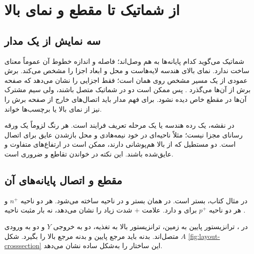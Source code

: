 \section{از شماتیک تا مقطع و نمای بالا}
\label{sec:layout-views}
\subsection{سه نمایش از یک مدار}
شماتیک می‌گوید کدام پایانه‌ها به هم وصل‌اند؛ فاصله و اندازه خطوط آن عموماً معنای
ساخت ندارد.  نمای بالای هندسه لایه‌هاست و محل و ابعاد اجزا را مشخص می‌کند.
 برش عمودی از یک مسیر مشخص روی همان  است؛
فقط اجزایی را نشان می‌دهد که صفحه برش از آن‌ها می‌گذرد
\cite[بخش  و شکل‌های  و ]{weste}.
پس ممکن است دو  در شماتیک متصل باشند، ولی سیم مشترک آن‌ها در مقطع خاص دیده نشود.
برای فهم مدار باید اتصال‌های خارج از صفحه برش را نیز از نمای بالا یا برچسب‌ها خواند.

 در نقشه، یک رده هندسه یا یک مرحله تعریف فرایند است.
هر رنگ لزوماً یک ورقه رسانای مجزا نیست؛ مثلاً  ناحیه‌ای در خود
نیمه‌هادی و  محل بازشدن عایق برای اتصال است.
دو مستطیل که از بالا هم‌پوشانی دارند، ممکن است در ارتفاع‌های متفاوت و عایق‌شده باشند.
این نکته در خواندن تقاطع  و  ضروری است.

\subsection{مقطع  و اتصال پایانه‌های آن}
در مثال کتاب، بستر  است.  در همان بستر و
 در ناحیه  ساخته می‌شود.
هر  دو ناحیه \(n^+\) و هر  دو ناحیه \(p^+\)
برای  و  دارد.
علامت \(+\) شدت زیاد  را نشان می‌دهد، نه بار مثبت ناحیه
\cite[بخش ]{weste}.

در ،  ترانزیستور پایین به زمین، 
ترانزیستور بالا به تغذیه، دو  به خروجی \(Y\) و دو 
به ورودی \(A\) متصل‌اند. بدنه  باید مرجع پایین و بدنه 
مرجع بالا را بگیرد. شکل \ref{fig:layout-crosssection} این ساختار را به‌شکل ساده نشان می‌دهد.

